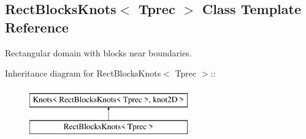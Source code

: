 \hypertarget{classRectBlocksKnots}{
\subsection{RectBlocksKnots$<$ Tprec $>$ Class Template Reference}
\label{classRectBlocksKnots}
}
Rectangular domain with blocks near boundaries.  


Inheritance diagram for RectBlocksKnots$<$ Tprec $>$::\begin{figure}[H]
\begin{center}
\leavevmode
\includegraphics[height=2cm]{classRectBlocksKnots}
\end{center}
\end{figure}
